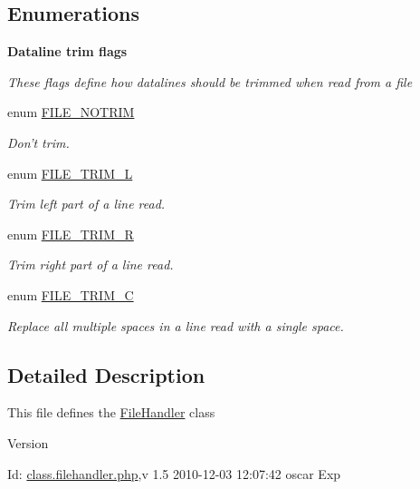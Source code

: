 \subsection*{Enumerations}
\begin{Indent}{\bf Dataline trim flags}\par
{\em \label{_amgrp09e264f44360b2d7954f16ee5d28e654}
 These flags define how datalines should be trimmed when read from a file }\begin{DoxyCompactItemize}
\item 
enum \hyperlink{class_8filehandler_8php_a3720f2e15eb9e16e29d8ecbb96763662}{FILE\_\-NOTRIM} 
\begin{DoxyCompactList}\small\item\em Don't trim. \item\end{DoxyCompactList}\item 
enum \hyperlink{class_8filehandler_8php_a080de95fd7cf2e8d8ac78ac7ad9471ee}{FILE\_\-TRIM\_\-L} 
\begin{DoxyCompactList}\small\item\em Trim left part of a line read. \item\end{DoxyCompactList}\item 
enum \hyperlink{class_8filehandler_8php_a7ee25ec88036b90f5a0ae8be7bc41769}{FILE\_\-TRIM\_\-R} 
\begin{DoxyCompactList}\small\item\em Trim right part of a line read. \item\end{DoxyCompactList}\item 
enum \hyperlink{class_8filehandler_8php_a2787c3a1ecef8697c863800d0b2848a4}{FILE\_\-TRIM\_\-C} 
\begin{DoxyCompactList}\small\item\em Replace all multiple spaces in a line read with a single space. \item\end{DoxyCompactList}\end{DoxyCompactItemize}
\end{Indent}


\subsection{Detailed Description}
This file defines the \hyperlink{classFileHandler}{FileHandler} class \begin{DoxyVersion}{Version}

\end{DoxyVersion}
\begin{DoxyParagraph}{Id:}
\hyperlink{class_8filehandler_8php}{class.filehandler.php},v 1.5 2010-\/12-\/03 12:07:42 oscar Exp 
\end{DoxyParagraph}



